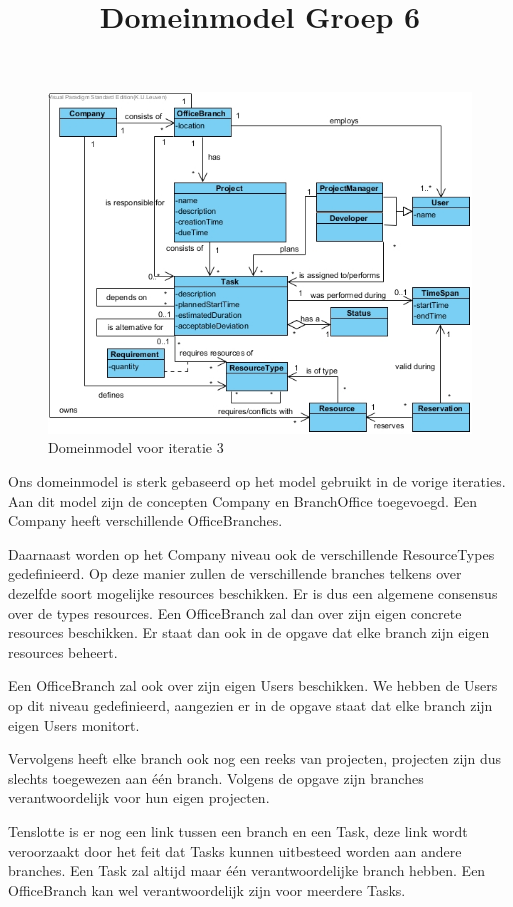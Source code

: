 \documentclass{article}
\title{Domeinmodel Groep 6}
\begin{document}
\maketitle

\begin{figure}[h]%
\includegraphics[width=\columnwidth]{DomainModel}%
\caption{Domeinmodel voor iteratie 3}%
\label{img: dom}%
\end{figure}

Ons domeinmodel is sterk gebaseerd op het model gebruikt in de vorige iteraties. Aan dit model zijn de concepten Company en BranchOffice toegevoegd. Een Company heeft verschillende OfficeBranches. 

Daarnaast worden op het Company niveau ook de verschillende ResourceTypes gedefinieerd. Op deze manier zullen de verschillende branches telkens over dezelfde soort mogelijke resources beschikken. Er is dus een algemene consensus over de types resources. Een OfficeBranch zal dan over zijn eigen concrete resources beschikken. Er staat dan ook in de opgave dat elke branch zijn eigen resources beheert.

Een OfficeBranch zal ook over zijn eigen Users beschikken. We hebben de Users op dit niveau gedefinieerd, aangezien er in de opgave staat dat elke branch zijn eigen Users monitort.

Vervolgens heeft elke branch ook nog een reeks van projecten, projecten zijn dus slechts toegewezen aan \'{e}\'{e}n branch. Volgens de opgave zijn branches verantwoordelijk voor hun eigen projecten.

Tenslotte is er nog een link tussen een branch en een Task, deze link wordt veroorzaakt door het feit dat Tasks kunnen uitbesteed worden aan andere branches. Een Task zal altijd maar \'{e}\'{e}n verantwoordelijke branch hebben. Een OfficeBranch kan wel verantwoordelijk zijn voor meerdere Tasks.
\end{document}
